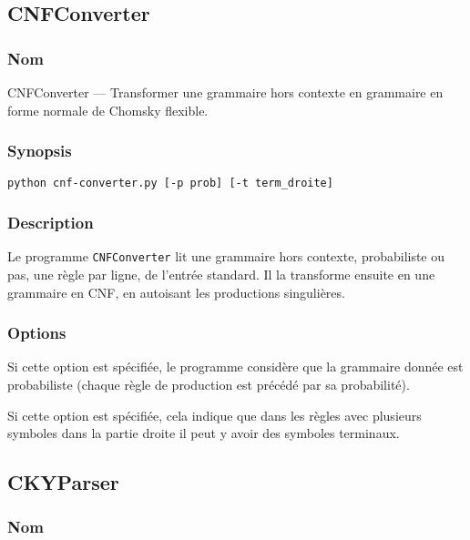 \documentclass[12pt]{article}
\begin{document}
\subsection{CNFConverter}
\subsubsection{Nom}

CNFConverter --- Transformer une grammaire hors contexte en grammaire en forme
normale de Chomsky flexible.

\subsubsection{Synopsis}

{\ttfamily
\begin{verbatim}
python cnf-converter.py [-p prob] [-t term_droite]
\end{verbatim}
}

\subsubsection{Description}

Le programme \texttt{CNFConverter} lit une grammaire hors contexte, probabiliste
ou pas, une r\`egle par ligne, de l'entr\'ee standard.
Il la transforme ensuite en une grammaire en CNF, en autoisant les productions
singuli\`eres.

\subsubsection{Options}

\begin{description}[style=nextline]
\item[\texttt{-p, --prob}] Si cette option est sp\'ecifi\'ee, le programme consid\`ere
que la grammaire donn\'ee est probabiliste (chaque r\`egle de production est
pr\'ec\'ed\'e par sa probabilit\'e).
\item[\texttt{-t, --term\_droite}] Si cette option est sp\'ecifi\'ee, cela
indique que dans les r\`egles avec plusieurs symboles dans la partie
droite il peut y avoir des symboles terminaux.
\end{description}

\subsection{CKYParser}
\subsubsection{Nom}
\end{document}

